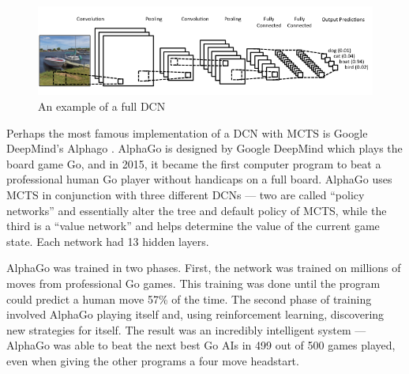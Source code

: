 \begin{figure}[h]
\centering
\includegraphics[scale=0.5]{images/cnnfull.png}
\caption{An example of a full DCN \cite{clarifai}}
\label{ref:cnnfull}
\end{figure}

Perhaps the most famous implementation of a DCN with MCTS is Google DeepMind's Alphago \cite{alphago}.  AlphaGo is designed by Google DeepMind which plays the board game Go, and in 2015, it became the first computer program to beat a professional human Go player without handicaps on a full board.  AlphaGo uses MCTS in conjunction with three different DCNs --- two are called ``policy networks'' and essentially alter the tree and default policy of MCTS, while the third is a ``value network'' and helps determine the value of the current game state.  Each network had 13 hidden layers.

AlphaGo was trained in two phases. First, the network was trained on millions of moves from professional Go games. This training was done until the program could predict a human move 57\% of the time. The second phase of training involved AlphaGo playing itself and, using reinforcement learning, discovering new strategies for itself. The result was an incredibly intelligent system --- AlphaGo was able to beat the next best Go AIs in 499 out of 500 games played, even when giving the other programs a four move headstart.\cite{alphago}
